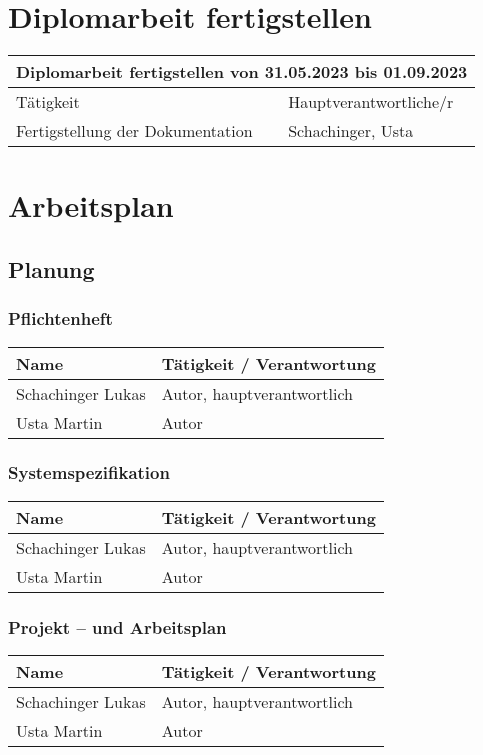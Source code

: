 \section{Diplomarbeit fertigstellen}
\begin{tabular}{|m{}|m{}|}
\hline
\multicolumn{2}{|c|}{\textbf{Diplomarbeit fertigstellen von 31.05.2023 bis 01.09.2023}} \\
\hline
Tätigkeit & Hauptverantwortliche/r \\
\hline
Fertigstellung der Dokumentation & Schachinger, Usta\\
\hline
\end{tabular}

\pagebreak

\section{Arbeitsplan}
\subsection{Planung}
\subsubsection{Pflichtenheft}
\begin{tabular}{|m{}|m{}|}
\hline
\textbf{Name} & \textbf{Tätigkeit / Verantwortung} \\
\hline
Schachinger Lukas & Autor, hauptverantwortlich \\
\hline
Usta Martin & Autor \\
\hline
\end{tabular}

\subsubsection{Systemspezifikation}
\begin{tabular}{|m{}|m{}|}
\hline
\textbf{Name} & \textbf{Tätigkeit / Verantwortung} \\
\hline
Schachinger Lukas & Autor, hauptverantwortlich \\
\hline
Usta Martin & Autor \\
\hline
\end{tabular}

\subsubsection{Projekt – und Arbeitsplan}
\begin{tabular}{|m{}|m{}|}
\hline
\textbf{Name} & \textbf{Tätigkeit / Verantwortung} \\
\hline
Schachinger Lukas & Autor, hauptverantwortlich \\
\hline
Usta Martin & Autor \\
\hline
\end{tabular}
